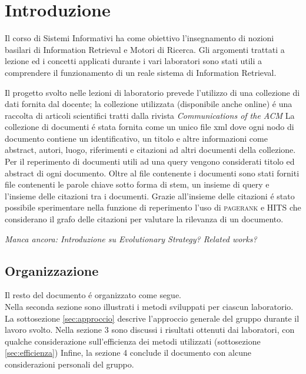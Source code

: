 \section{Introduzione}
\label{sec:introduzione}

Il corso di Sistemi Informativi ha come obiettivo l'insegnamento di nozioni basilari di Information Retrieval e Motori di Ricerca. Gli argomenti trattati a lezione ed i concetti applicati durante i vari laboratori sono stati utili a comprendere il funzionamento di un reale sistema di Information Retrieval.

Il progetto svolto nelle lezioni di laboratorio prevede l'utilizzo di una collezione di dati fornita dal docente; la collezione utilizzata (disponibile anche online) \'e una raccolta di articoli scientifici tratti dalla rivista \textit{Communications of the ACM} \cite{ACMCollection} %
La collezione di documenti \'e stata fornita come un unico file xml dove ogni nodo di documento contiene un identificativo, un titolo e altre informazioni come abstract, autori, luogo, riferimenti e citazioni ad altri documenti della collezione. Per il reperimento di documenti utili ad una query vengono considerati titolo ed abstract di ogni documento.
Oltre al file contenente i documenti sono stati forniti file contenenti le parole chiave sotto forma di stem, un insieme di query e l'insieme delle citazioni tra i documenti.
Grazie all'insieme delle citazioni \'e stato possibile sperimentare nella funzione di reperimento l'uso di \textsc{pagerank} e \textsc{HITS} che considerano il grafo delle citazioni per valutare la rilevanza di un documento.
\vspace*{30px}

\textit{Manca ancora: Introduzione su Evolutionary Strategy? Related works?}
\subsection{Organizzazione}
Il resto del documento \'e organizzato come segue.\\
Nella seconda sezione sono illustrati i metodi sviluppati per ciascun laboratorio. La sottosezione \ref{sec:approccio} descrive l'approccio generale del gruppo durante il lavoro svolto.
Nella sezione 3 sono discussi i risultati ottenuti dai laboratori, con qualche considerazione sull'efficienza dei metodi utilizzati (sottosezione \ref{sec:efficienza})
Infine, la sezione 4 conclude il documento con alcune considerazioni personali del gruppo.

